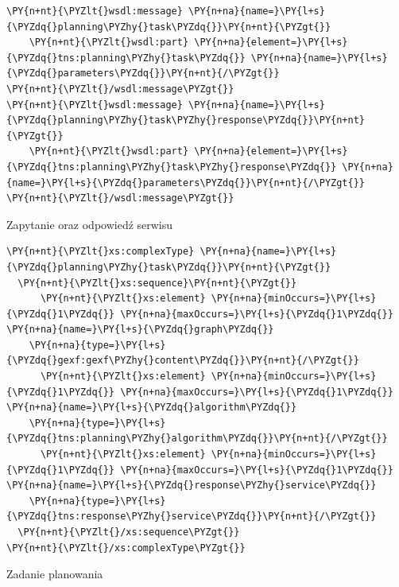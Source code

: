 \begin{program}
\begin{code}
\begin{Verbatim}[commandchars=\\\{\}]
\PY{n+nt}{\PYZlt{}wsdl:message} \PY{n+na}{name=}\PY{l+s}{\PYZdq{}planning\PYZhy{}task\PYZdq{}}\PY{n+nt}{\PYZgt{}}
    \PY{n+nt}{\PYZlt{}wsdl:part} \PY{n+na}{element=}\PY{l+s}{\PYZdq{}tns:planning\PYZhy{}task\PYZdq{}} \PY{n+na}{name=}\PY{l+s}{\PYZdq{}parameters\PYZdq{}}\PY{n+nt}{/\PYZgt{}}
\PY{n+nt}{\PYZlt{}/wsdl:message\PYZgt{}}
\PY{n+nt}{\PYZlt{}wsdl:message} \PY{n+na}{name=}\PY{l+s}{\PYZdq{}planning\PYZhy{}task\PYZhy{}response\PYZdq{}}\PY{n+nt}{\PYZgt{}}
    \PY{n+nt}{\PYZlt{}wsdl:part} \PY{n+na}{element=}\PY{l+s}{\PYZdq{}tns:planning\PYZhy{}task\PYZhy{}response\PYZdq{}} \PY{n+na}{name=}\PY{l+s}{\PYZdq{}parameters\PYZdq{}}\PY{n+nt}{/\PYZgt{}}
\PY{n+nt}{\PYZlt{}/wsdl:message\PYZgt{}}
\end{Verbatim}
\end{code}
\caption{Zapytanie oraz odpowiedź serwisu}
\end{program}

\begin{program}
\begin{code}
\begin{Verbatim}[commandchars=\\\{\}]
\PY{n+nt}{\PYZlt{}xs:complexType} \PY{n+na}{name=}\PY{l+s}{\PYZdq{}planning\PYZhy{}task\PYZdq{}}\PY{n+nt}{\PYZgt{}}
  \PY{n+nt}{\PYZlt{}xs:sequence}\PY{n+nt}{\PYZgt{}}
      \PY{n+nt}{\PYZlt{}xs:element} \PY{n+na}{minOccurs=}\PY{l+s}{\PYZdq{}1\PYZdq{}} \PY{n+na}{maxOccurs=}\PY{l+s}{\PYZdq{}1\PYZdq{}} \PY{n+na}{name=}\PY{l+s}{\PYZdq{}graph\PYZdq{}} 
	\PY{n+na}{type=}\PY{l+s}{\PYZdq{}gexf:gexf\PYZhy{}content\PYZdq{}}\PY{n+nt}{/\PYZgt{}}
      \PY{n+nt}{\PYZlt{}xs:element} \PY{n+na}{minOccurs=}\PY{l+s}{\PYZdq{}1\PYZdq{}} \PY{n+na}{maxOccurs=}\PY{l+s}{\PYZdq{}1\PYZdq{}} \PY{n+na}{name=}\PY{l+s}{\PYZdq{}algorithm\PYZdq{}} 
	\PY{n+na}{type=}\PY{l+s}{\PYZdq{}tns:planning\PYZhy{}algorithm\PYZdq{}}\PY{n+nt}{/\PYZgt{}}
      \PY{n+nt}{\PYZlt{}xs:element} \PY{n+na}{minOccurs=}\PY{l+s}{\PYZdq{}1\PYZdq{}} \PY{n+na}{maxOccurs=}\PY{l+s}{\PYZdq{}1\PYZdq{}} \PY{n+na}{name=}\PY{l+s}{\PYZdq{}response\PYZhy{}service\PYZdq{}} 
	\PY{n+na}{type=}\PY{l+s}{\PYZdq{}tns:response\PYZhy{}service\PYZdq{}}\PY{n+nt}{/\PYZgt{}}
  \PY{n+nt}{\PYZlt{}/xs:sequence\PYZgt{}}
\PY{n+nt}{\PYZlt{}/xs:complexType\PYZgt{}}
\end{Verbatim}
\end{code}
\caption{Zadanie planowania}
\end{program}

